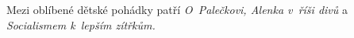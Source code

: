 Mezi oblíbené dětské pohádky patří \emph{O~Palečkovi,
Alenka v~říši divů} a \emph{Socialismem k~lepším zítřkům.}